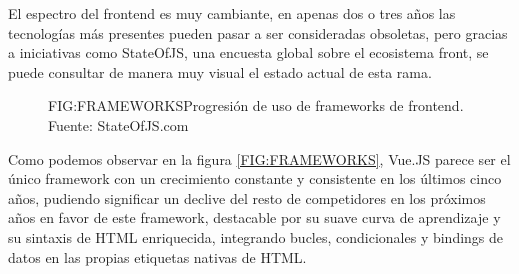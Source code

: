 
El espectro del frontend es muy cambiante, en apenas dos o tres años las tecnologías más presentes pueden pasar a ser consideradas obsoletas, pero gracias a iniciativas como StateOfJS\cite{StateOfJS}, una encuesta global sobre el ecosistema front, se puede consultar de manera muy visual el estado actual de esta rama.

\begin{figure}[Frameworks de frontend]{FIG:FRAMEWORKS}{Progresión de uso de frameworks de frontend. Fuente: StateOfJS.com}
\end{figure}

Como podemos observar en la figura \ref{FIG:FRAMEWORKS}, Vue.JS parece ser el único framework con un crecimiento constante y consistente en los últimos cinco años, pudiendo significar un declive del resto de competidores en los próximos años en favor de este framework, destacable por su suave curva de aprendizaje y su sintaxis de HTML enriquecida, integrando bucles, condicionales y bindings de datos en las propias etiquetas nativas de HTML.
